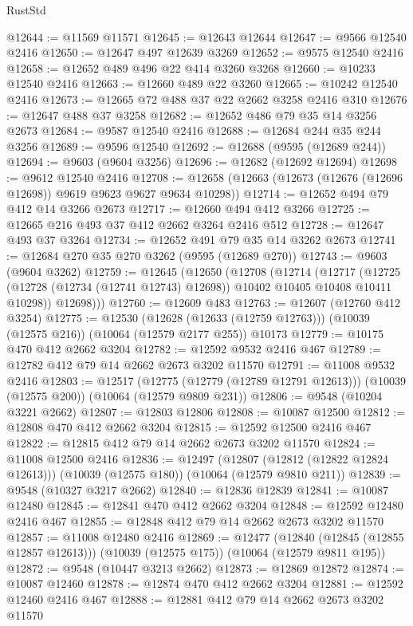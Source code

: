 \begin{lexlean}{RustStd}
\begin{coremodule}
@12644 := @11569 @11571
@12645 := @12643 @12644
@12647 := @9566 @12540 @2416
@12650 := @12647 @497 @12639 @3269
@12652 := @9575 @12540 @2416
@12658 := @12652 @489 @496 @22 @414 @3260 @3268
@12660 := @10233 @12540 @2416
@12663 := @12660 @489 @22 @3260
@12665 := @10242 @12540 @2416
@12673 := @12665 @72 @488 @37 @22 @2662 @3258 @2416 @310
@12676 := @12647 @488 @37 @3258
@12682 := @12652 @486 @79 @35 @14 @3256 @2673
@12684 := @9587 @12540 @2416
@12688 := @12684 @244 @35 @244 @3256
@12689 := @9596 @12540
@12692 := @12688 (@9595 (@12689 @244))
@12694 := @9603 (@9604 @3256)
@12696 := @12682 (@12692 @12694)
@12698 := @9612 @12540 @2416
@12708 := @12658 (@12663 (@12673 (@12676 (@12696 @12698)) @9619 @9623 @9627 @9634 @10298))
@12714 := @12652 @494 @79 @412 @14 @3266 @2673
@12717 := @12660 @494 @412 @3266
@12725 := @12665 @216 @493 @37 @412 @2662 @3264 @2416 @512
@12728 := @12647 @493 @37 @3264
@12734 := @12652 @491 @79 @35 @14 @3262 @2673
@12741 := @12684 @270 @35 @270 @3262 (@9595 (@12689 @270))
@12743 := @9603 (@9604 @3262)
@12759 := @12645
    (@12650
      (@12708
        (@12714
          (@12717
            (@12725 (@12728 (@12734 (@12741 @12743) @12698)) @10402 @10405 @10408 @10411 @10298))
          @12698)))
@12760 := @12609 @483
@12763 := @12607 (@12760 @412 @3254)
@12775 := @12530
    (@12628 (@12633 (@12759 @12763)))
    (@10039 (@12575 @216))
    (@10064 (@12579 @2177 @255))
    @10173
@12779 := @10175 @470 @412 @2662 @3204
@12782 := @12592 @9532 @2416 @467
@12789 := @12782 @412 @79 @14 @2662 @2673 @3202 @11570
@12791 := @11008 @9532 @2416
@12803 := @12517
    (@12775 (@12779 (@12789 @12791 @12613)))
    (@10039 (@12575 @200))
    (@10064 (@12579 @9809 @231))
@12806 := @9548 (@10204 @3221 @2662)
@12807 := @12803 @12806
@12808 := @10087 @12500
@12812 := @12808 @470 @412 @2662 @3204
@12815 := @12592 @12500 @2416 @467
@12822 := @12815 @412 @79 @14 @2662 @2673 @3202 @11570
@12824 := @11008 @12500 @2416
@12836 := @12497
    (@12807 (@12812 (@12822 @12824 @12613)))
    (@10039 (@12575 @180))
    (@10064 (@12579 @9810 @211))
@12839 := @9548 (@10327 @3217 @2662)
@12840 := @12836 @12839
@12841 := @10087 @12480
@12845 := @12841 @470 @412 @2662 @3204
@12848 := @12592 @12480 @2416 @467
@12855 := @12848 @412 @79 @14 @2662 @2673 @3202 @11570
@12857 := @11008 @12480 @2416
@12869 := @12477
    (@12840 (@12845 (@12855 @12857 @12613)))
    (@10039 (@12575 @175))
    (@10064 (@12579 @9811 @195))
@12872 := @9548 (@10447 @3213 @2662)
@12873 := @12869 @12872
@12874 := @10087 @12460
@12878 := @12874 @470 @412 @2662 @3204
@12881 := @12592 @12460 @2416 @467
@12888 := @12881 @412 @79 @14 @2662 @2673 @3202 @11570

\end{coremodule}
\end{lexlean}

